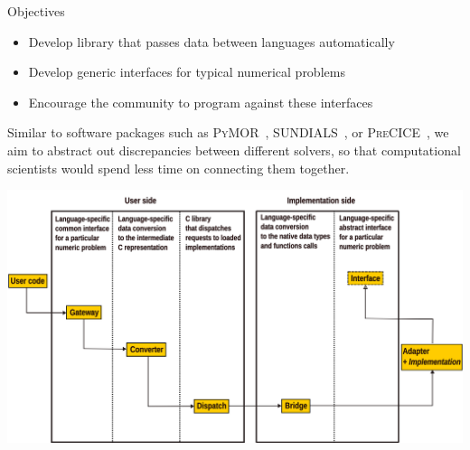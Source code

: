 \documentclass[a0paper, twocolumn, csc, english, final]{mpi2015_poster}
\begin{document}
\begin{poster}
\begin{pcolumn}
\begin{pbox}

      \begin{center}
        \begin{tcolorbox}[
          colback=white, colframe=mardiblue, parbox=true,
          left=1em, right=1em,
                    before={\par\bigskip\noindent}, after={\par\bigskip},  width=\columnwidth]
  {\Large\color{mardiblue}Objectives\medskip}
  \begin{itemize}
        \item Develop library that passes data between languages automatically
        \item Develop generic interfaces for typical numerical problems
        \item Encourage the community to program against these interfaces
  \end{itemize}
  \end{tcolorbox}
  \end{center}

      Similar to software packages such as \textsc{PyMOR}~\citep{Milk2016},
      \textsc{SUNDIALS}~\citep{GardnerEtAl2022},
      or \textsc{PreCICE}~\citep{Chourdakis2022},
      we aim to abstract out discrepancies between
      different solvers, so that computational scientists would spend less time
      on connecting them together.

    \end{pbox}

    \begin{pbox}
      \large
      \includegraphics[width=\columnwidth]{arch}


\end{pbox}
\end{pcolumn}
\end{poster}
\end{document}

